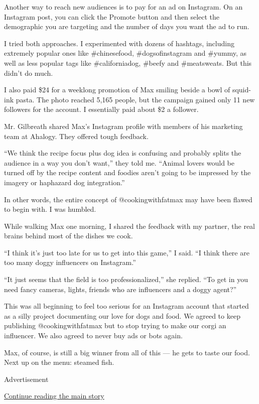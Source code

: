 Another way to reach new audiences is to pay for an ad on Instagram. On
an Instagram post, you can click the Promote button and then select the
demographic you are targeting and the number of days you want the ad to
run.

I tried both approaches. I experimented with dozens of hashtags,
including extremely popular ones like \#chinesefood, \#dogsofinstagram
and \#yummy, as well as less popular tags like \#californiadog, \#beefy
and \#meatsweats. But this didn't do much.

I also paid \$24 for a weeklong promotion of Max smiling beside a bowl
of squid-ink pasta. The photo reached 5,165 people, but the campaign
gained only 11 new followers for the account. I essentially paid about
\$2 a follower.

Mr. Gilbreath shared Max's Instagram profile with members of his
marketing team at Ahalogy. They offered tough feedback.

``We think the recipe focus plus dog idea is confusing and probably
splits the audience in a way you don't want,'' they told me. ``Animal
lovers would be turned off by the recipe content and foodies aren't
going to be impressed by the imagery or haphazard dog integration.''

In other words, the entire concept of @cookingwithfatmax may have been
flawed to begin with. I was humbled.

While walking Max one morning, I shared the feedback with my partner,
the real brains behind most of the dishes we cook.

``I think it's just too late for us to get into this game,'' I said. ``I
think there are too many doggy influencers on Instagram.''

``It just seems that the field is too professionalized,'' she replied.
``To get in you need fancy cameras, lights, friends who are influencers
and a doggy agent?''

This was all beginning to feel too serious for an Instagram account that
started as a silly project documenting our love for dogs and food. We
agreed to keep publishing @cookingwithfatmax but to stop trying to make
our corgi an influencer. We also agreed to never buy ads or bots again.

Max, of course, is still a big winner from all of this --- he gets to
taste our food. Next up on the menu: steamed fish.

Advertisement

\protect\hyperlink{after-bottom}{Continue reading the main story}

